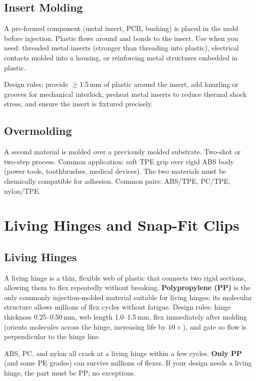 \documentclass[11pt,letterpaper,twoside,openany]{book}
\begin{document}
\subsection{Insert Molding}
A pre-formed component (metal insert, PCB, bushing) is placed in the mold before injection. Plastic flows around and bonds to the insert. Use when you need: threaded metal inserts (stronger than threading into plastic), electrical contacts molded into a housing, or reinforcing metal structures embedded in plastic.

Design rules: provide $\geq$1.5\,mm of plastic around the insert, add knurling or grooves for mechanical interlock, preheat metal inserts to reduce thermal shock stress, and ensure the insert is fixtured precisely.

\subsection{Overmolding}
A second material is molded over a previously molded substrate. Two-shot or two-step process. Common application: soft TPE grip over rigid ABS body (power tools, toothbrushes, medical devices). The two materials must be chemically compatible for adhesion. Common pairs: ABS/TPE, PC/TPE, nylon/TPE.

\section{Living Hinges and Snap-Fit Clips}
\subsection{Living Hinges}
A living hinge is a thin, flexible web of plastic that connects two rigid sections, allowing them to flex repeatedly without breaking. \textbf{Polypropylene (PP)} is the only commonly injection-molded material suitable for living hinges; its molecular structure allows millions of flex cycles without fatigue. Design rules: hinge thickness 0.25--0.50\,mm, web length 1.0--1.5\,mm, flex immediately after molding (orients molecules across the hinge, increasing life by $10\times$), and gate so flow is perpendicular to the hinge line.

\begin{tipbox}
ABS, PC, and nylon all crack at a living hinge within a few cycles. \textbf{Only PP} (and some PE grades) can survive millions of flexes. If your design needs a living hinge, the part must be PP; no exceptions.
\end{tipbox}
\end{document}

